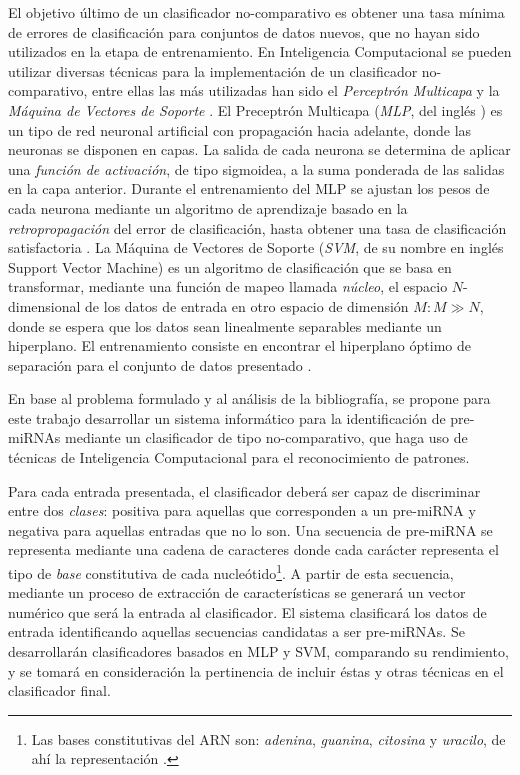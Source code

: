 \documentclass[12pt,bibliography=oldstyle,DIV=12,parskip=full-,titlepage]{scrartcl}
\begin{document}
El objetivo último de un clasificador no-comparativo es obtener una
tasa mínima de errores de clasificación para conjuntos de datos
nuevos, que no hayan sido utilizados en la etapa de entrenamiento.  En
Inteligencia Computacional se pueden utilizar diversas técnicas para
la implementación de un clasificador no-comparativo, entre ellas las
más utilizadas han sido el \emph{Perceptrón Multicapa}
\cite{mlp1}\cite{mlp2} y la \emph{Máquina de Vectores de Soporte}
\cite{svm}.  El Preceptrón Multicapa (\emph{MLP}, del inglés
) es un tipo de red neuronal artificial con
propagación hacia adelante, donde las neuronas se disponen en capas.
La salida de cada neurona se determina de aplicar una \emph{función de
  activación}, de tipo sigmoidea, a la suma ponderada de las salidas
en la capa anterior. Durante el entrenamiento del MLP se ajustan los
pesos de cada neurona mediante un algoritmo de aprendizaje basado en
la \emph{retropropagación} del error de clasificación, hasta obtener
una tasa de clasificación satisfactoria \cite{jain}.  La Máquina de
Vectores de Soporte (\emph{SVM}, de su nombre en inglés {Support
  Vector Machine}) es un algoritmo de clasificación que se basa en
transformar, mediante una función de mapeo llamada \emph{núcleo}, el
espacio $N$-dimensional de los datos de entrada en otro espacio de
dimensión $M: M\gg N$, donde se espera que los datos sean linealmente
separables mediante un hiperplano. El entrenamiento consiste en
encontrar el hiperplano óptimo de separación para el conjunto de datos
presentado \cite{bottou}.

En base al problema formulado y al análisis de la bibliografía, se
propone para este trabajo desarrollar un sistema informático para la
identificación de pre-miRNAs mediante un clasificador de tipo
no-comparativo, que haga uso de técnicas de Inteligencia Computacional
para el reconocimiento de patrones.

Para cada entrada presentada, el clasificador deberá ser capaz de
discriminar entre dos \emph{clases}: positiva para aquellas que
corresponden a un pre-miRNA y negativa para aquellas entradas que no
lo son. 
Una secuencia de pre-miRNA se representa mediante una cadena de
caracteres  donde cada carácter representa el tipo
de \emph{base} constitutiva de cada nucleótido\footnote{Las bases
  constitutivas del ARN son: \emph{adenina}, \emph{guanina},
  \emph{citosina} y \emph{uracilo}, de ahí la representación .}.
A partir de esta secuencia, mediante un proceso de extracción de
características se generará un vector numérico que será la entrada al
clasificador.  El sistema clasificará los datos de entrada
identificando aquellas secuencias candidatas a ser pre-miRNAs.  Se
desarrollarán clasificadores basados en MLP y SVM, comparando su rendimiento, y se tomará en
consideración la pertinencia de incluir éstas y otras técnicas en el
clasificador final.
\end{document}

